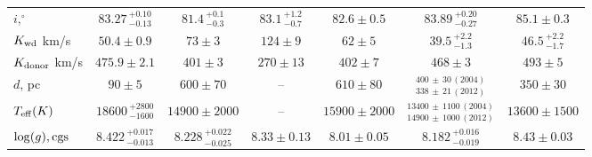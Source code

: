 \begin{landscape}
\begin{table}
\begin{tabular}{lcccccc}
            $i, ^\circ$                 & $83.27\,^{+0.10}_{-0.13}$         & $81.4\,^{+0.1}_{-0.3}$                & $83.1\,^{+1.2}_{-0.7}$        & $82.6\pm0.5$                  & $83.89\,^{+0.20}_{-0.27}$                                 & $85.1\pm0.3$                      \\
            $K_{\rm wd}$ km/s           & $50.4\pm0.9$                      & $73\pm3$                              & $124\pm9$                     & $62\pm5$                      & $39.5\,^{+2.2}_{-1.3}$                                    & $46.5\,^{+2.2}_{-1.7}$            \\
            $K_{\rm donor}$ km/s        & $475.9\pm2.1$                     & $401\pm3$                             & $270\pm13$                    & $402\pm7$                     & $468\pm3$                                                 & $493\pm5$                         \\
            \hline
            $d$, pc                     & $90\pm5$                          & $600\pm70$                            & --                            & $610\pm80$                    & $^{400\,\pm\,30\,(2004)}_{338\,\pm\,21\,(2012)}$          & $350\pm30$                        \\
            $T_{\rm eff} (K)$           & $18600\,^{+2800}_{-1600}$         & $14900\pm2000$                        & --                            & $15900\pm2000$                & $^{13400\,\pm\,1100\,(2004)}_{14900\,\pm\,1000\,(2012)}$  & $13600\pm1500$                    \\
            $\log(g), {\rm cgs}$        & $8.422\,^{+0.017}_{-0.013}$       & $8.228\,^{+0.022}_{-0.025}$           & $8.33\pm0.13$                 & $8.01\pm0.05$                 & $8.182\,^{+0.016}_{-0.019}$                               & $8.43\pm0.03$                     \\
            \hline \hline
        \end{tabular}
    \end{table}


\end{landscape}
